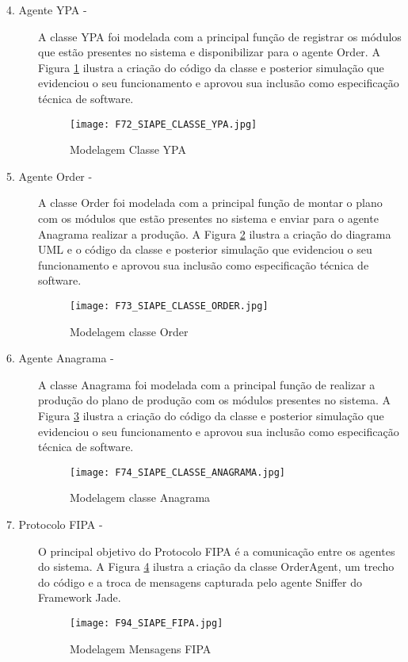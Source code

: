 \begin{description}
 	  \item[4. Agente YPA - ]
 	    A classe YPA foi modelada com a principal função de registrar os módulos que estão presentes no  sistema e disponibilizar para o agente Order. A Figura \ref{F72} ilustra a criação do código da classe e posterior simulação que evidenciou o seu funcionamento e aprovou sua inclusão como especificação técnica de software.  
 	  	
 	  \begin{figure}[!h]
 	  	\centering
 	  	\texttt{[image: F72\_SIAPE\_CLASSE\_YPA.jpg]} 
 	  	\caption{Modelagem Classe YPA}
 	  	\label{F72}
 	  \end{figure}
 	  
 	  \item[5. Agente Order - ]  
 	    A classe Order foi modelada com a principal função de montar o plano com os módulos que estão presentes no  sistema e enviar para o agente Anagrama realizar a produção. A Figura \ref{F73} ilustra a criação do diagrama UML e o código da classe e posterior simulação que evidenciou o seu funcionamento e aprovou sua inclusão como especificação técnica de software.  
 	  	
 	  \begin{figure}[!h]
 	  	\centering
 	  	\texttt{[image: F73\_SIAPE\_CLASSE\_ORDER.jpg]} 
 	  	\caption{Modelagem classe Order}
 	  	\label{F73}
 	  \end{figure}
 	   	  
 	 \item[6. Agente Anagrama - ] 
 	  A classe Anagrama foi modelada com a principal função de realizar a produção do plano de produção com os módulos presentes no  sistema. A Figura \ref{F74} ilustra a criação do código da classe e posterior simulação que evidenciou o seu funcionamento e aprovou sua inclusão como especificação técnica de software.  
 	 	
 	  \begin{figure}[!h]
 	  	\centering
 	  	\texttt{[image: F74\_SIAPE\_CLASSE\_ANAGRAMA.jpg]} 
 	  	\caption{Modelagem classe Anagrama}
 	  	\label{F74}
 	  \end{figure}
 	  
 	  	  	   	  
 	  \item[7. Protocolo FIPA - ] 
 	  O principal objetivo do Protocolo FIPA é a comunicação entre os agentes do sistema. A Figura \ref{F94} ilustra a criação da classe OrderAgent, um trecho do código e a troca de mensagens capturada pelo agente Sniffer do Framework Jade.  
 	  
 	  
 	   \begin{figure}[!h]
 	   	\centering
 	   	\texttt{[image: F94\_SIAPE\_FIPA.jpg]} 
 	   	\caption{Modelagem Mensagens FIPA}
 	   	\label{F94}
 	   \end{figure}	  
 	\end{description}
 	
